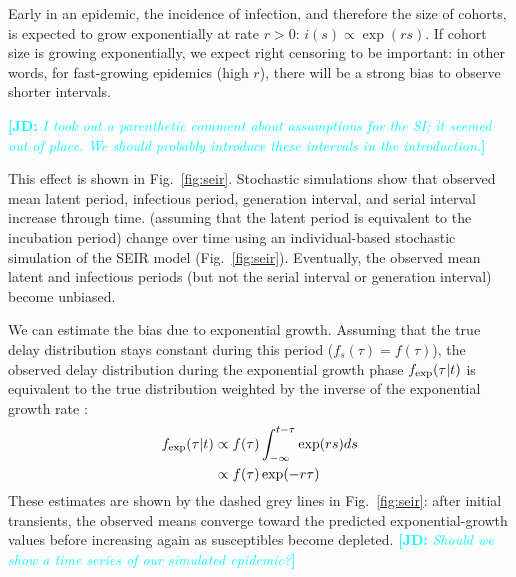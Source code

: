 \documentclass[12pt]{article}
\newcommand{\fref}[1]{Fig.~\ref{fig:#1}}
\newcommand{\comment}[3]{\textcolor{#1}{\textbf{[#2: }\textsl{#3}\textbf{]}}}
\newcommand{\jd}[1]{\comment{cyan}{JD}{#1}}
\begin{document}
Early in an epidemic, the incidence of infection, and therefore the size of cohorts, is expected to grow exponentially at rate $r > 0$: $i(s) \propto \exp(rs)$.
If cohort size is growing exponentially, we expect right censoring to be important: in other words, for fast-growing epidemics (high $r$), there will be a strong bias to observe shorter intervals.

\jd{I took out a parenthetic comment about assumptions for the SI; it seemed out of place. We should probably introduce these intervals in the introduction.}

This effect is shown in \fref{seir}. Stochastic simulations show that observed mean latent period, infectious period, generation interval, and serial interval increase through time. (assuming that the latent period is equivalent to the incubation period) change over time using an individual-based stochastic simulation of the SEIR model (\fref{seir}).
Eventually, the observed mean latent and infectious periods (but not the serial interval or generation interval) become unbiased.

We can estimate the bias due to exponential growth.
Assuming that the true delay distribution stays constant during this period ($f_s(\tau) = f(\tau)$), 
the observed delay distribution during the exponential growth phase $f_{\tiny\textrm{exp}}(\tau|t)$ is equivalent to the true distribution weighted by the inverse of the exponential growth rate \citep{britton2019estimation}:
\begin{equation}
\begin{aligned}
f_{\tiny\textrm{exp}}(\tau|t) &\propto f(\tau) \int_{-\infty}^{t-\tau} \exp(rs) ds\\
&\propto f(\tau) \exp(-r\tau) \\
\end{aligned}
\end{equation}
These estimates are shown by the dashed grey lines in \fref{seir}: after initial transients, the observed means converge toward the predicted exponential-growth values before increasing again as susceptibles become depleted. \jd{Should we show a time series of our simulated epidemic?}
\end{document}
